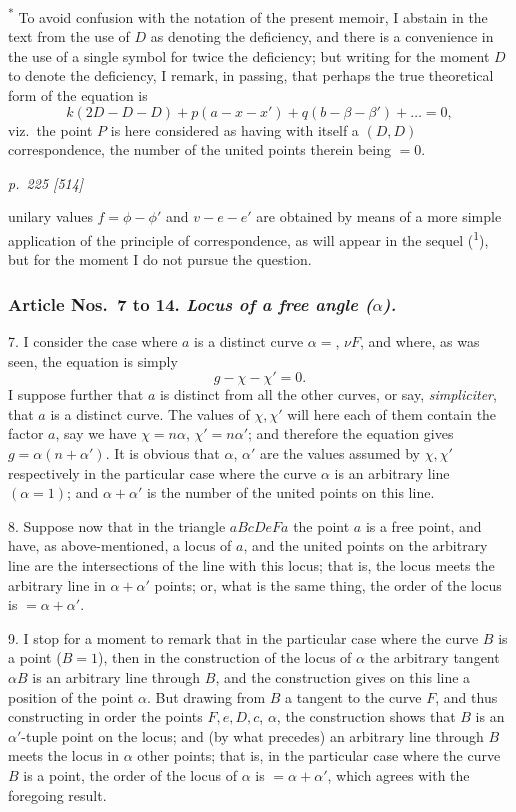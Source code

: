 \documentclass[11pt,a4paper]{article}
\theoremstyle{plain}
\theoremstyle{definition}
\begin{document}
\bigskip
\noindent\textsuperscript{*} To avoid confusion with the notation of the present memoir, I abstain in the text from the use of $D$
as denoting the deficiency, and there is a convenience in the use of a single symbol for twice the deficiency;
but writing for the moment $D$ to denote the deficiency, I remark, in passing, that perhaps the true theoretical
form of the equation is
\[
k(2D-D-D)+p(a-x-x')+q(b-\beta-\beta')+\ldots = 0,
\]
viz.\ the point $P$ is here considered as having with itself a $(D, D)$ correspondence, the number of the united
points therein being $=0$.

\clearpage

\bigskip
\textit{p.~225 [514]}
\smallskip

unilary values $f=\phi-\phi'$ and $v-e-e'$ are obtained by means of a more simple
application of the principle of correspondence, as will appear in the sequel (\textsuperscript{1}), but for
the moment I do not pursue the question.

\bigskip
\subsubsection*{Article Nos.\ 7 to 14.  \textit{Locus of a free angle ($\alpha$).}}

7. I consider the case where $a$ is a distinct curve $\alpha=$, $\nu F$, and where, as was
seen, the equation is simply
\[
g-\chi-\chi'=0.
\]
I suppose further that $a$ is distinct from all the other curves, or say, \textit{simpliciter}, that
$a$ is a distinct curve.  The values of $\chi, \chi'$ will here each of them contain the factor $a$,
say we have $\chi=n\alpha$, $\chi'=n\alpha'$; and therefore the equation gives $g=\alpha(n+\alpha')$.  It is
obvious that $\alpha$, $\alpha'$ are the values assumed by $\chi, \chi'$ respectively in the particular case
where the curve $\alpha$ is an arbitrary line $(\alpha=1)$; and $\alpha+\alpha'$ is the number of the
united points on this line.

8. Suppose now that in the triangle $aBcDeFa$ the point $a$ is a free point, and
have, as above-mentioned, a locus of $a$, and the united points on the arbitrary line
are the intersections of the line with this locus; that is, the locus meets the arbitrary
line in $\alpha+\alpha'$ points; or, what is the same thing, the order of the locus is $=\alpha+\alpha'$.

9. I stop for a moment to remark that in the particular case where the curve
$B$ is a point ($B=1$), then in the construction of the locus of $\alpha$ the arbitrary tangent
$\alpha B$ is an arbitrary line through $B$, and the construction gives on this line a position
of the point $\alpha$.  But drawing from $B$ a tangent to the curve $F$, and thus constructing
in order the points $F, e, D, c$, $\alpha$, the construction shows that $B$ is an $\alpha'$-tuple point
on the locus; and (by what precedes) an arbitrary line through $B$ meets the locus in
$\alpha$ other points; that is, in the particular case where the curve $B$ is a point, the
order of the locus of $\alpha$ is $= \alpha + \alpha'$, which agrees with the foregoing result.
\end{document}
